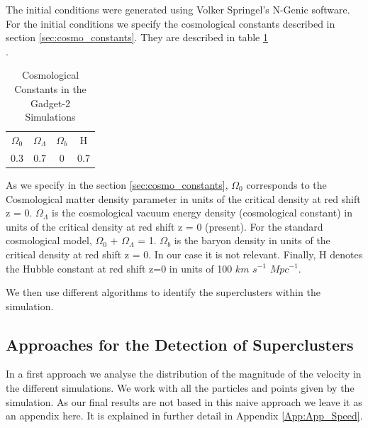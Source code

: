 \documentclass[12pt]{article}
\begin{document}
The initial conditions were generated using Volker
 Springel's N-Genic software. For the initial
  conditions we specify the cosmological constants
   described in section \ref{sec:cosmo_constants}. They
    are described in table \ref{tab:consts}\\.
   
  
 \begin{table}[ht]
    \centering
    \begin{tabular}{|c|c|c|c|}
        $\Omega_0$ & $\Omega_{\Lambda}$ & $\Omega_b$ & H \\
        0.3 &  0.7 & 0 & 0.7 \\
    \end{tabular}
    \caption{Cosmological Constants in the Gadget-2 Simulations}
    \label{tab:consts}
\end{table}
\FloatBarrier

As we specify in the section \ref{sec:cosmo_constants}, $\Omega_0$  corresponds to the Cosmological matter
 density parameter in units of the critical density at
red shift z = 0. $\Omega_{\Lambda}$ is the cosmological
 vacuum energy density (cosmological constant) in
  units of the critical density at red shift z = 0 (present). 
For the standard cosmological model, $\Omega_0$ + $\Omega_{\Lambda}$ = 1.
 $\Omega_b$ is the baryon density in units
  of the critical density at red shift z = 0. In our
   case it
   is not relevant. Finally, H denotes the Hubble
    constant at red shift z=0 in  units of 100 
    $km$ $s^{-1}$
     $Mpc^{-1}$. 

We then use different algorithms to identify the
 superclusters within the simulation.\\

\subsection{Approaches for the Detection of Superclusters} \label{sec:approaches}
\begin{par}
In a first approach we analyse the distribution of
 the magnitude of the velocity in the different
  simulations. We work with all the particles and
   points given by the simulation. As our final
    results are not based in this naive approach
     we leave it as an appendix here. It is
      explained in further detail in Appendix
       \ref{App:App_Speed}.\\
\end{par}
\end{document}
